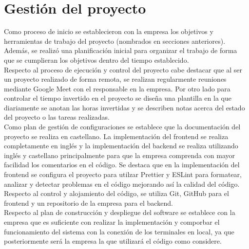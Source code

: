 \chapter{Gestión del proyecto}


Como proceso de inicio se establecieron con la empresa los objetivos y herramientas de trabajo del proyecto (nombrados en secciones anteriores). Además, se realizó una planificación inicial para organizar el trabajo de forma que se cumplieran los objetivos dentro del tiempo establecido. \\

Respecto al proceso de ejecución y control del proyecto cabe destacar que al ser un proyecto realizado de forma remota, se realizan regularmente reuniones mediante Google Meet con el responsable en la empresa. Por otro lado para controlar el tiempo invertido en el proyecto se diseña una plantilla en la que diariamente se anotan las horas invertidas y se describen notas acerca del estado del proyecto o las tareas realizadas. \\

Como plan de gestión de configuraciones se establece que la documentación del proyecto se realiza en castellano. La implementación del frontend se realiza completamente en inglés y la implementación del backend se realiza utilizando inglés y castellano principalmente para que la empresa comprenda con mayor facilidad los comentarios en el código. Se destaca que en la implementación del frontend se configura el proyecto para utilzar Prettier \cite{prettier} y ESLint \cite{eslint} para formatear, analizar y detectar problemas en el código mejorando así la calidad del código. Respecto al control y alojamiento del código, se utiliza Git, GitHub para el frontend y un repositorio de la empresa para el backend. \\


Respecto al plan de construcción y despliegue del software se establece con la empresa que es suficiente con realizar la implementación y comporbar el funcionamiento del sistema con la conexión de los terminales en local, ya que posteriormente será la empresa la que utilizará el código como considere. \\

